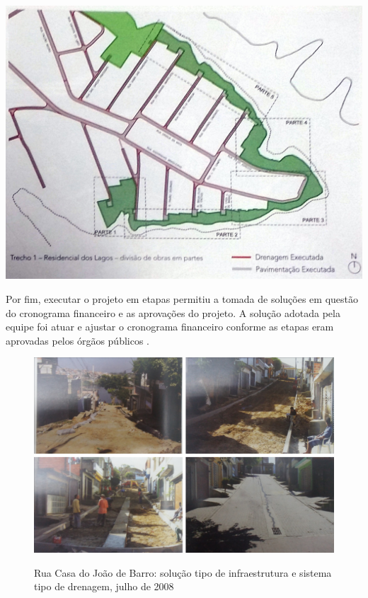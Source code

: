 	\begin{minipage}[b]{.4\linewidth}
		\includegraphics[width=\textwidth]{img/barda_trecho_reslagos}
		\label{fig:barda_trecho_reslagos}
	\end{minipage}
	
	Por fim, executar o projeto em etapas permitiu a tomada de soluções em questão do cronograma financeiro e as aprovações do projeto. A solução adotada pela equipe foi atuar e ajustar o cronograma financeiro conforme as etapas eram aprovadas pelos órgãos públicos \cite{Barda2012}.
	
	\begin{figure}[htb]
		\centering
		\caption[Soluções adotadas na rua Casa do João de Barro]{Rua Casa do João de Barro: solução tipo de infraestrutura e sistema tipo de drenagem, julho de 2008}
		\includegraphics[width=\linewidth]{img/barda_solucoes}
		\label{fig:solucoes}
	\end{figure}
	
